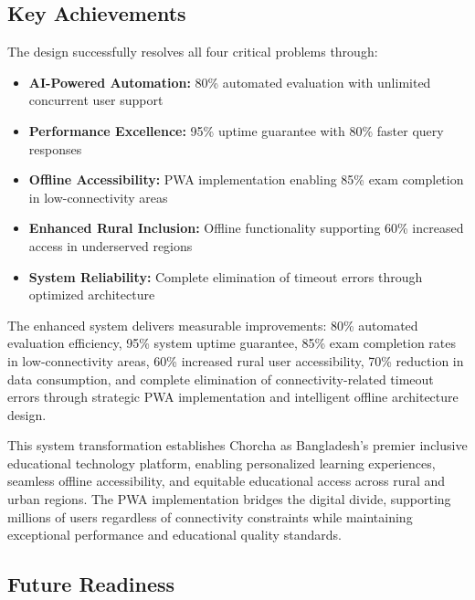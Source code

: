 \documentclass[12pt,a4paper,oneside]{book}
\begin{document}
\subsection{Key Achievements}

The design successfully resolves all four critical problems through:

\begin{itemize}
    \item \textbf{AI-Powered Automation:} 80\% automated evaluation with unlimited concurrent user support
    \item \textbf{Performance Excellence:} 95\% uptime guarantee with 80\% faster query responses
    \item \textbf{Offline Accessibility:} PWA implementation enabling 85\% exam completion in low-connectivity areas
    \item \textbf{Enhanced Rural Inclusion:} Offline functionality supporting 60\% increased access in underserved regions
    \item \textbf{System Reliability:} Complete elimination of timeout errors through optimized architecture
\end{itemize}

\begin{tcolorbox}[benefitbox, title=Quantified Impact Achievements]
The enhanced system delivers measurable improvements: 80\% automated evaluation efficiency, 95\% system uptime guarantee, 85\% exam completion rates in low-connectivity areas, 60\% increased rural user accessibility, 70\% reduction in data consumption, and complete elimination of connectivity-related timeout errors through strategic PWA implementation and intelligent offline architecture design.
\end{tcolorbox}

\begin{tcolorbox}[impactbox, title=Transformational Impact on Education]
This system transformation establishes Chorcha as Bangladesh's premier inclusive educational technology platform, enabling personalized learning experiences, seamless offline accessibility, and equitable educational access across rural and urban regions. The PWA implementation bridges the digital divide, supporting millions of users regardless of connectivity constraints while maintaining exceptional performance and educational quality standards.
\end{tcolorbox}

\subsection{Future Readiness}
\end{document}
